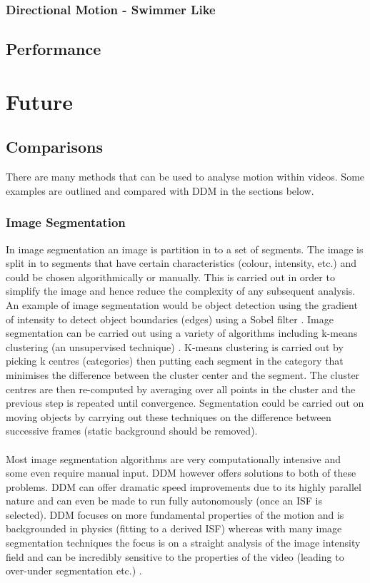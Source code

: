 \documentclass[11pt]{article}
\begin{document}
\subsubsection{Directional Motion - Swimmer Like}

\subsection{Performance}
\label{section:performance}


\section{Future}
\subsection{Comparisons}
There are many methods that can be used to analyse motion within videos. Some examples are outlined and compared with DDM in the sections below.
\subsubsection{Image Segmentation}
In image segmentation an image is partition in to a set of segments. The image is split in to segments that have certain characteristics (colour, intensity, etc.) and could be chosen algorithmically or manually. This is carried out in order to simplify the image and hence reduce the complexity of any subsequent analysis. \cite{computer_vision_book} An example of image segmentation would be object detection using the gradient of intensity to detect object boundaries (edges) using a Sobel filter \cite{sobel}. Image segmentation can be carried out using a variety of algorithms including k-means clustering (an unsupervised technique) \cite{segmentation_kmeans}. K-means clustering is carried out by picking k centres (categories) then putting each segment in the category that minimises the difference between the cluster center and the segment. The cluster centres are then re-computed by averaging over all points in the cluster and the previous step is repeated until convergence. Segmentation could be carried out on moving objects by carrying out these techniques on the difference between successive frames (static background should be removed).
\\\\
Most image segmentation algorithms are very computationally intensive and some even require manual input. DDM however offers solutions to both of these problems. DDM can offer dramatic speed improvements due to its highly parallel nature and can even be made to run fully autonomously (once an ISF is selected). DDM focuses on more fundamental properties of the motion and is backgrounded in physics (fitting to a derived ISF) whereas with many image segmentation techniques the focus is on a straight analysis of the image intensity field and can be incredibly sensitive to the properties of the video (leading to over-under segmentation etc.) \cite{computer_vision_book}. 
\end{document}
